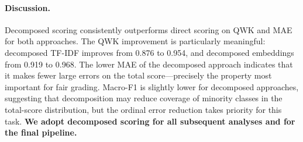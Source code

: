 \documentclass[11pt]{article}
\begin{document}
\paragraph{Discussion.} Decomposed scoring consistently outperforms direct scoring on QWK and MAE for both approaches. The QWK improvement is particularly meaningful: decomposed TF-IDF improves from 0.876 to 0.954, and decomposed embeddings from 0.919 to 0.968. The lower MAE of the decomposed approach indicates that it makes fewer large errors on the total score—precisely the property most important for fair grading. Macro-F1 is slightly lower for decomposed approaches, suggesting that decomposition may reduce coverage of minority classes in the total-score distribution, but the ordinal error reduction takes priority for this task. \textbf{We adopt decomposed scoring for all subsequent analyses and for the final pipeline.}
%



\end{document}
